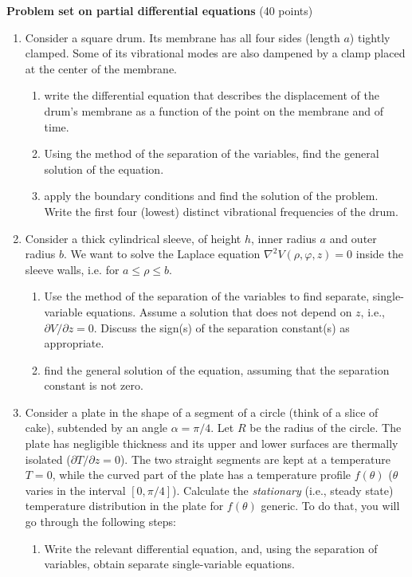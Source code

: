 \documentclass[fleqn]{article}
\begin{document}
  \pagebreak

  \textbf{Problem set on partial differential equations} (40 points)
  \begin{enumerate}

    \item  Consider a square drum. Its membrane has all four sides (length $a$) tightly clamped.  Some of its vibrational modes are also dampened by a clamp placed at the center of the membrane. 
    \begin{enumerate}
      \item  write the differential equation that describes the displacement of the drum's membrane as a function of the point on the membrane and of time. 
      
      \item Using the method of the separation of the variables, find the general solution of the equation. 
      
      \item apply the boundary conditions and find the solution of the problem. Write the first four (lowest) distinct vibrational frequencies of the drum. 
    \end{enumerate}
    
    
    \item Consider a thick cylindrical sleeve, of height $h$, inner radius $a$ and outer radius $b$.  We want to solve the 
      Laplace equation $\nabla^{2}V(\rho,\varphi,z)=0$ inside the sleeve walls, i.e. for  $a \le \rho \le b$.
    
      \begin{enumerate}
          \item Use the method of the separation of the variables to find separate, single-variable equations.  Assume a solution that does not depend on $z$, i.e., $\partial V/\partial z =0$.  Discuss the sign(s) of the separation constant(s) as appropriate.
          
          \item find the general solution of the equation, assuming that the separation constant is not zero.   
      \end{enumerate}
    
    \item Consider a plate in the shape of a segment of a circle (think of a slice of cake), subtended by an angle $\alpha=\pi/4$. 
    Let $R$ be the radius of the circle.  The plate has negligible thickness and its upper and lower surfaces are thermally isolated
    ($\partial T/\partial z=0$). The two straight segments are kept at a temperature $T=0$, while the curved part of the plate 
    has a temperature profile $f(\theta)$ ($\theta$ varies in the interval $\left[ 0 , \pi/4 \right]$). Calculate the 
    {\it stationary} (i.e., steady state) temperature distribution in the plate for $f(\theta)$ generic. 
    To do that, you will go through the following steps: 
      \begin{enumerate}
          \item  Write the relevant differential equation, and, using the separation of variables, obtain  separate single-variable equations. \\
          

\end{enumerate}
\end{enumerate}
\end{document}
